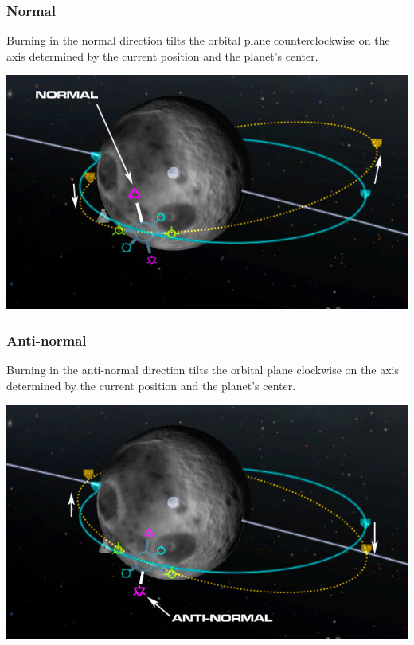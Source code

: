 \begin{frame}
    \frametitle{Normal}
    \begin{block}{}
        Burning in the normal direction tilts the orbital plane counterclockwise on the axis determined by the current
        position and the planet's center.
    \end{block}
    \begin{center}
        \includegraphics[scale=0.5]{images/normal}
    \end{center}
\end{frame}
\begin{frame}
    \frametitle{Anti-normal}
    \begin{block}{}
        Burning in the anti-normal direction tilts the orbital plane clockwise on the axis determined by the current
        position and the planet's center.
    \end{block}
    \begin{center}
        \includegraphics[scale=0.4]{images/anti_normal}
    \end{center}
\end{frame}
